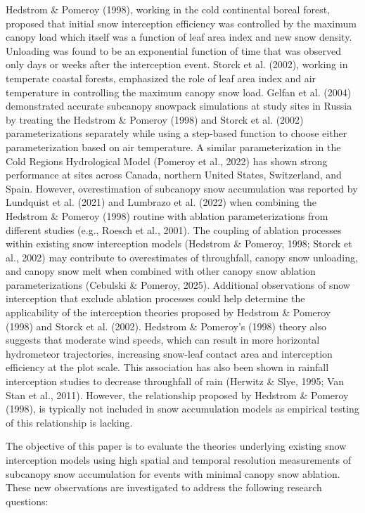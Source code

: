\documentclass[
  letterpaper,
  DIV=11,
  numbers=noendperiod]{scrartcl}
\begin{document}
Hedstrom \& Pomeroy (1998), working in the cold continental boreal
forest, proposed that initial snow interception efficiency was
controlled by the maximum canopy load which itself was a function of
leaf area index and new snow density. Unloading was found to be an
exponential function of time that was observed only days or weeks after
the interception event. Storck et al. (2002), working in temperate
coastal forests, emphasized the role of leaf area index and air
temperature in controlling the maximum canopy snow load. Gelfan et al.
(2004) demonstrated accurate subcanopy snowpack simulations at study
sites in Russia by treating the Hedstrom \& Pomeroy (1998) and Storck et
al. (2002) parameterizations separately while using a step-based
function to choose either parameterization based on air temperature. A
similar parameterization in the Cold Regions Hydrological Model (Pomeroy
et al., 2022) has shown strong performance at sites across Canada,
northern United States, Switzerland, and Spain. However, overestimation
of subcanopy snow accumulation was reported by Lundquist et al. (2021)
and Lumbrazo et al. (2022) when combining the Hedstrom \& Pomeroy (1998)
routine with ablation parameterizations from different studies (e.g.,
Roesch et al., 2001). The coupling of ablation processes within existing
snow interception models (Hedstrom \& Pomeroy, 1998; Storck et al.,
2002) may contribute to overestimates of throughfall, canopy snow
unloading, and canopy snow melt when combined with other canopy snow
ablation parameterizations (Cebulski \& Pomeroy, 2025). Additional
observations of snow interception that exclude ablation processes could
help determine the applicability of the interception theories proposed
by Hedstrom \& Pomeroy (1998) and Storck et al. (2002). Hedstrom \&
Pomeroy's (1998) theory also suggests that moderate wind speeds, which
can result in more horizontal hydrometeor trajectories, increasing
snow-leaf contact area and interception efficiency at the plot scale.
This association has also been shown in rainfall interception studies to
decrease throughfall of rain (Herwitz \& Slye, 1995; Van Stan et al.,
2011). However, the relationship proposed by Hedstrom \& Pomeroy (1998),
is typically not included in snow accumulation models as empirical
testing of this relationship is lacking.

The objective of this paper is to evaluate the theories underlying
existing snow interception models using high spatial and temporal
resolution measurements of subcanopy snow accumulation for events with
minimal canopy snow ablation. These new observations are investigated to
address the following research questions:
\end{document}
